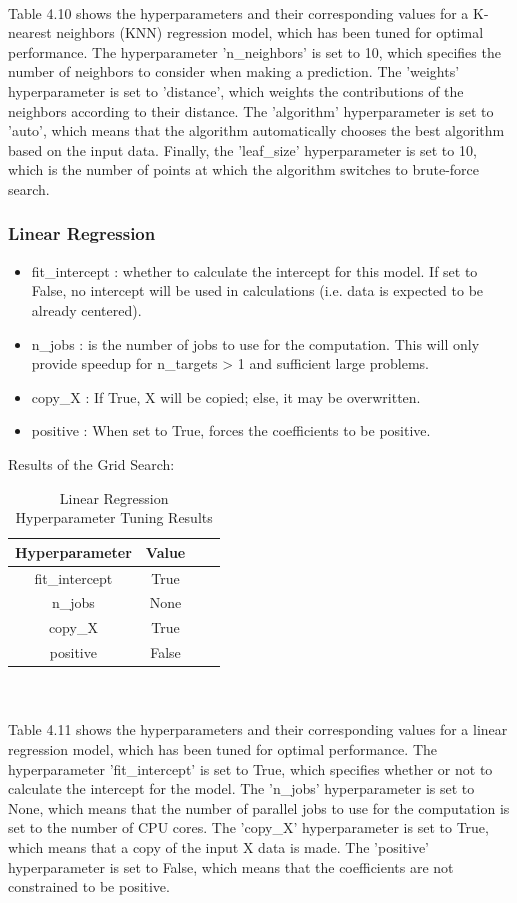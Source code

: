\documentclass{report}
\begin{document}
\\
Table 4.10 shows the hyperparameters and their corresponding values for a K-nearest neighbors (KNN) regression model, which has been tuned for optimal performance. The hyperparameter 'n\_neighbors' is set to 10, which specifies the number of neighbors to consider when making a prediction. The 'weights' hyperparameter is set to 'distance', which weights the contributions of the neighbors according to their distance. The 'algorithm' hyperparameter is set to 'auto', which means that the algorithm automatically chooses the best algorithm based on the input data. Finally, the 'leaf\_size' hyperparameter is set to 10, which is the number of points at which the algorithm switches to brute-force search. 
\subsubsection{Linear Regression}
\begin{itemize}
    \item fit\_intercept : whether to calculate the intercept for this model. If set to False, no intercept will be used in calculations (i.e. data is expected to be already centered)\cite{scikit-learn}. 
    \item n\_jobs : is the number of jobs to use for the computation. This will only provide speedup for n\_targets > 1 and sufficient large problems\cite{scikit-learn}. 
    \item copy\_X : If True, X will be copied; else, it may be overwritten\cite{scikit-learn}. 
    \item positive : When set to True, forces the coefficients to be positive\cite{scikit-learn}. 
\end{itemize}
Results of the Grid Search:
\begin{table}[h]
\centering
\begin{tabular}{|c|c|c|c|}
\hline
\textbf{Hyperparameter} & \textbf{Value} \\ \hline
fit\_intercept & True \\ \hline
n\_jobs & None \\ \hline
copy\_X & True \\ \hline
positive & False \\ \hline
\end{tabular}
\caption{Linear Regression Hyperparameter Tuning Results}
\end{table}\\
\\
Table 4.11 shows the hyperparameters and their corresponding values for a linear regression model, which has been tuned for optimal performance. The hyperparameter 'fit\_intercept' is set to True, which specifies whether or not to calculate the intercept for the model. The 'n\_jobs' hyperparameter is set to None, which means that the number of parallel jobs to use for the computation is set to the number of CPU cores. The 'copy\_X' hyperparameter is set to True, which means that a copy of the input X data is made. The 'positive' hyperparameter is set to False, which means that the coefficients are not constrained to be positive. 
\end{document}
